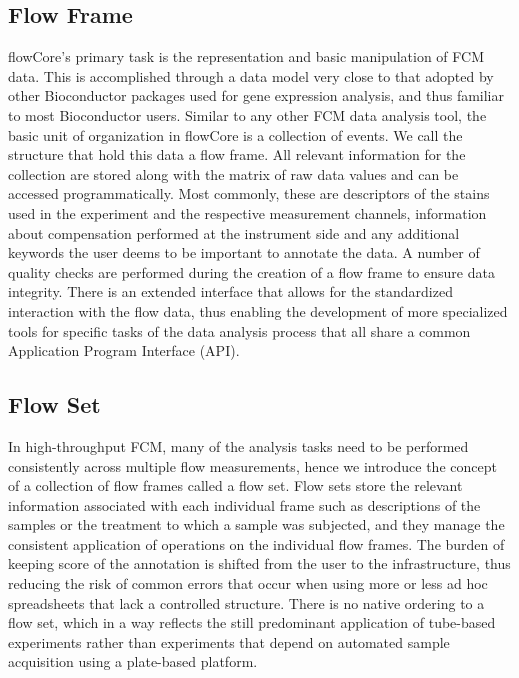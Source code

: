\documentclass[12pt]{article}
\begin{document}
\subsection*{Flow Frame}
flowCore's primary task is the representation and basic manipulation
of FCM data. This is accomplished through a data model very
close to that adopted by other Bioconductor packages used for gene
expression analysis, and thus familiar to most Bioconductor
users. Similar to any other FCM data analysis tool, the basic unit of organization
in flowCore is a collection of events. We call the structure that hold
this data a flow frame. All relevant information for the collection
are stored along with the matrix of raw data values and can be
accessed programmatically. Most commonly, these are descriptors of the
stains used in the experiment and the respective measurement channels,
information about compensation performed at the instrument side and
any additional keywords the user deems to be important to annotate the
data. A number of quality checks are performed during the creation of
a flow frame to ensure data integrity. There is an extended interface
that allows for the standardized interaction with the flow data, thus
enabling the development of more specialized tools for specific tasks
of the data analysis process that all share a common Application Program Interface (API).

\subsection*{Flow Set}
In high-throughput FCM, many of the analysis tasks need to be
performed consistently across multiple flow measurements, hence we
introduce the concept of a collection of flow frames called a flow
set. Flow sets store the relevant information associated with each
individual frame such as descriptions of the samples or the treatment
to which a sample was subjected, and they manage the consistent
application of operations on the individual flow frames. The burden of
keeping score of the annotation is shifted from the user to the
infrastructure, thus reducing the risk of common errors %
that occur when using more or less ad hoc spreadsheets that
lack a controlled structure. There is no native ordering
to a flow set, which in a way reflects the still predominant
application of tube-based experiments rather than experiments
that depend on automated sample acquisition using a plate-based platform. 
\end{document}
